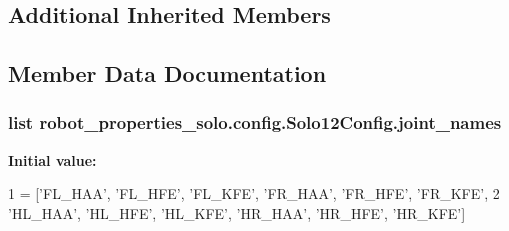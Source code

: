 \subsection*{Additional Inherited Members}


\subsection{Member Data Documentation}
\subsubsection[{\texorpdfstring{joint\+\_\+names}{joint_names}}]{\setlength{\rightskip}{0pt plus 5cm}list robot\+\_\+properties\+\_\+solo.\+config.\+Solo12\+Config.\+joint\+\_\+names\hspace{0.3cm}{\ttfamily [static]}}\hypertarget{classrobot__properties__solo_1_1config_1_1Solo12Config_a81d9c86f1ce4c8c0b8f936cb05eb00a8}{}\label{classrobot__properties__solo_1_1config_1_1Solo12Config_a81d9c86f1ce4c8c0b8f936cb05eb00a8}
{\bfseries Initial value\+:}
\begin{DoxyCode}
1 = [\textcolor{stringliteral}{'FL\_HAA'}, \textcolor{stringliteral}{'FL\_HFE'}, \textcolor{stringliteral}{'FL\_KFE'}, \textcolor{stringliteral}{'FR\_HAA'}, \textcolor{stringliteral}{'FR\_HFE'}, \textcolor{stringliteral}{'FR\_KFE'},
2                    \textcolor{stringliteral}{'HL\_HAA'}, \textcolor{stringliteral}{'HL\_HFE'}, \textcolor{stringliteral}{'HL\_KFE'}, \textcolor{stringliteral}{'HR\_HAA'}, \textcolor{stringliteral}{'HR\_HFE'}, \textcolor{stringliteral}{'HR\_KFE'}]
\end{DoxyCode}
